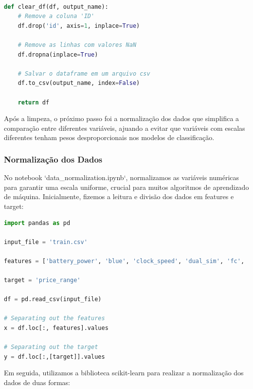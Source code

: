 \documentclass[conference]{IEEEtran}
\begin{document}
\\
\vspace{5mm}


\begin{lstlisting}[language=Python]
def clear_df(df, output_name):
    # Remove a coluna 'ID' 
    df.drop('id', axis=1, inplace=True)

    # Remove as linhas com valores NaN
    df.dropna(inplace=True)

    # Salvar o dataframe em um arquivo csv
    df.to_csv(output_name, index=False)

    return df
\end{lstlisting}

Após a limpeza, 
o próximo passo foi a normalização dos dados 
que simplifica a comparação entre diferentes variáveis,
ajuando a evitar que variáveis com escalas diferentes
tenham pesos desproporcionais nos modelos de classificação.

\subsubsection{Normalização dos Dados}

No notebook `data\_normalization.ipynb`, normalizamos as variáveis numéricas 
para garantir uma escala uniforme, 
crucial para muitos algoritmos de aprendizado de máquina.
Inicialmente, fizemos a leitura e divisão dos dados em features e target:
\begin{lstlisting}[language=Python]
import pandas as pd

input_file = 'train.csv'

features = ['battery_power', 'blue', 'clock_speed', 'dual_sim', 'fc', 'four_g', 'int_memory', 'm_dep', 'mobile_wt', 'n_cores', 'pc', 'px_height', 'px_width', 'ram', 'sc_h', 'sc_w', 'talk_time', 'three_g', 'touch_screen', 'wifi']

target = 'price_range'

df = pd.read_csv(input_file)

# Separating out the features
x = df.loc[:, features].values

# Separating out the target
y = df.loc[:,[target]].values
\end{lstlisting}

Em seguida, utilizamos a biblioteca scikit-learn para realizar a normalização dos dados de duas formas:
\end{document}
